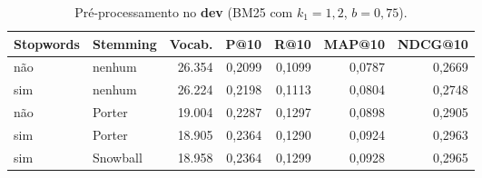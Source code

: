 \begin{table}[t]
\centering
\caption{Pré-processamento no \textbf{dev} (BM25 com $k_1=1{,}2$, $b=0{,}75$).}
\label{tab:dev_pre}
\small
\begin{tabular}{llrrrrr}
\toprule
Stopwords & Stemming & Vocab. & P@10 & R@10 & MAP@10 & NDCG@10 \\
\midrule
não & nenhum & 26.354 & 0,2099 & 0,1099 & 0,0787 & 0,2669 \\
sim & nenhum & 26.224 & 0,2198 & 0,1113 & 0,0804 & 0,2748 \\
não & Porter & 19.004 & 0,2287 & 0,1297 & 0,0898 & 0,2905 \\
sim & Porter & 18.905 & 0,2364 & 0,1290 & 0,0924 & 0,2963 \\
sim & Snowball & 18.958 & 0,2364 & 0,1299 & 0,0928 & 0,2965 \\
\bottomrule
\end{tabular}
\end{table}

